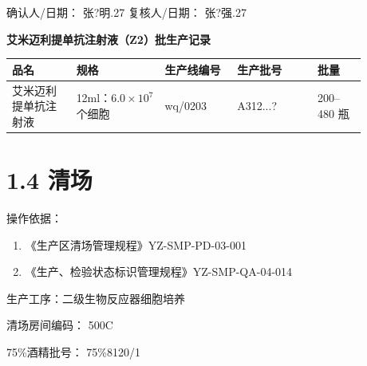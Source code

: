 \documentclass[UTF8,10pt,a4paper,fontset=fandol]{ctexart}
\newcommand{\fieldvalue}[1]{#1}
\newcommand{\handwritten}[1]{#1}
\begin{document}
确认人/日期：
\fieldvalue{\handwritten{张?明.27}}
\hfill
复核人/日期：
\fieldvalue{\handwritten{张?强.27}}

\newpage

\begin{center}
\textbf{艾米迈利提单抗注射液（Z2）批生产记录}
\end{center}

\begin{tabular}{|p{0.16\linewidth}|p{0.22\linewidth}|p{0.18\linewidth}|p{0.20\linewidth}|p{0.12\linewidth}|}
\hline
品名 & 规格 & 生产线编号 & 生产批号 & 批量 \\
\hline
\fieldvalue{艾米迈利提单抗注射液} &
\fieldvalue{12ml：$6.0\times10^{7}$个细胞} &
\fieldvalue{\handwritten{wq/0203}} &
\fieldvalue{\handwritten{A312...?}} &
\fieldvalue{200--480 瓶} \\
\hline
\end{tabular}

\section{1.4 清场}

操作依据：

\begin{enumerate}
\item 《生产区清场管理规程》\hfill YZ-SMP-PD-03-001
\item 《生产、检验状态标识管理规程》\hfill YZ-SMP-QA-04-014
\end{enumerate}

生产工序：二级生物反应器细胞培养

清场房间编码：
\fieldvalue{\handwritten{500C}}

\hfill 75\%酒精批号：
\fieldvalue{\handwritten{75\%8120/1}}
\end{document}
